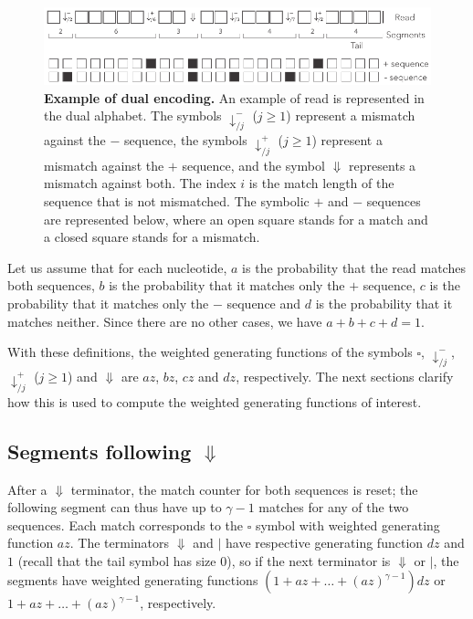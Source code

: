 \documentclass{article}
\begin{document}
\begin{figure}[h]
\centering
\includegraphics[scale=0.85]{sketch_dual.pdf}
\caption{\textbf{Example of dual encoding.}
An example of read is represented in the dual alphabet. The symbols
$\downarrow_{/j}^-$ ($j \geq 1$) represent a mismatch against the $-$
sequence, the symbols $\downarrow_{/j}^+$ ($j \geq 1$) represent a
mismatch against the $+$ sequence, and the symbol $\Downarrow$ represents
a mismatch against both. The index $i$ is the match length of the sequence
that is not mismatched. The symbolic $+$ and $-$ sequences are represented
below, where an open square stands for a match and a closed square stands
for a mismatch.}
\label{fig:dual}
\end{figure}

Let us assume that for each nucleotide, $a$ is the probability that the
read matches both sequences, $b$ is the probability that it matches only
the $+$ sequence, $c$ is the probability that it matches only the $-$
sequence and $d$ is the probability that it matches neither. Since there
are no other cases, we have $a+b+c+d=1$.

With these definitions, the weighted generating functions of the symbols
$\square$, $\downarrow_{/j}^-$, $\downarrow_{/j}^+$ ($j \geq 1$) and
$\Downarrow$ are $az$, $bz$, $cz$ and $dz$, respectively. The next
sections clarify how this is used to compute the weighted generating
functions of interest.


\subsection{Segments following $\Downarrow$}

After a $\Downarrow$ terminator, the match counter for both sequences is
reset; the following segment can thus have up to $\gamma-1$ matches for
any of the two sequences. Each match corresponds to the $\square$ symbol
with weighted generating function $az$. The terminators $\Downarrow$ and
$|$ have respective generating function $dz$ and $1$ (recall that the tail
symbol has size 0), so if the next terminator is $\Downarrow$ or $|$, the
segments have weighted generating functions $(1 + az + \ldots +
(az)^{\gamma-1})dz$ or $1 + az + \ldots + (az)^{\gamma-1}$, respectively.
\end{document}
